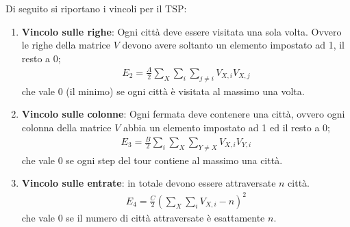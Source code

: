 Di seguito si riportano i vincoli per il TSP:

\begin{enumerate}
    \item \textbf{Vincolo sulle righe}: Ogni città deve essere visitata una sola volta. Ovvero le righe della matrice $V$ devono avere soltanto un elemento impostato ad 1, il resto a 0;
    \begin{align*}
        E_2 = \frac{A}{2} \sum_X \sum_i \sum_{j \neq i} V_{X,i} V_{X,j}
    \end{align*}
    che vale 0 (il minimo) se ogni città è visitata al massimo una volta.
    \item \textbf{Vincolo sulle colonne}: Ogni fermata deve contenere una città, ovvero ogni colonna della matrice $V$ abbia un elemento impostato ad 1 ed il resto a 0;
    \begin{align*}
        E_3 = \frac{B}{2} \sum_i \sum_X \sum_{Y \neq X} V_{X,i} V_{Y,i}
    \end{align*}
    che vale 0 se ogni step del tour contiene al massimo una città.
    \item \textbf{Vincolo sulle entrate}: in totale devono essere attraversate $n$ città.
    \begin{align*}
        E_4 = \frac{C}{2}\left(\sum_X \sum_i V_{X,i} - n \right)^2
    \end{align*}
    che vale 0 se il numero di città attraversate è esattamente $n$.
\end{enumerate}

\newpage

